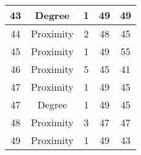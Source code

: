 \documentclass[results.tex]{subfiles}
\begin{document}
\begin{center}
\begin{tabular}{| c || c | c | c | c |}
    \hline
    43 & Degree & 1 & 49 & 49 \\ 
    \hline
    44 & Proximity & 2 & 48 & 45 \\ 
    \hline
    45 & Proximity & 1 & 49 & 55 \\ 
    \hline
    46 & Proximity & 5 & 45 & 41 \\ 
    \hline
    47 & Proximity & 1 & 49 & 45 \\ 
    \hline
    47 & Degree & 1 & 49 & 45 \\ 
    \hline
    48 & Proximity & 3 & 47 & 47 \\ 
    \hline
    49 & Proximity & 1 & 49 & 43 \\ 
    \hline   \end{tabular}
\end{center}
\end{document}

